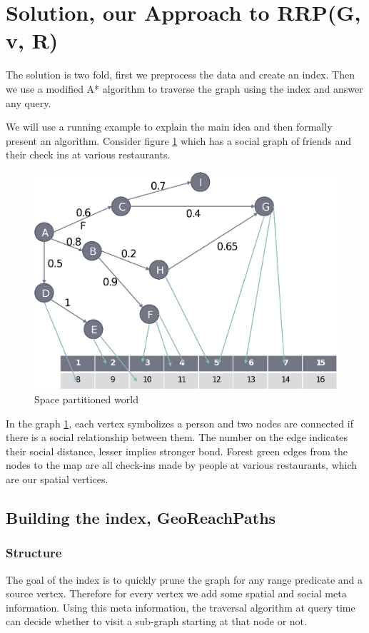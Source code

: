 \section{Solution, our Approach to RRP(G, v, R)}

{The solution is two fold, first we preprocess the data and create an index. Then we use a modified A* algorithm to traverse the graph using the index and answer any query.}

{We will use a running example to explain the main idea and then formally present an algorithm. Consider figure \ref{fig:space-partitioned} which has a social graph of friends and their check ins at various restaurants.}

\begin{figure}[h]
	\includegraphics[width=0.9\linewidth]{images/image05.eps}
    \caption{Space partitioned world}
    \label{fig:space-partitioned}
\end{figure}

{In the graph \ref{fig:space-partitioned}, each vertex symbolizes a person and two nodes are connected if there is a social relationship between them. The number on the edge indicates their social distance, lesser implies stronger bond. Forest green edges from the nodes to the map are all check-ins made by people at various restaurants, which are our spatial vertices. }

\subsection{Building the index, GeoReachPaths}

\subsubsection{Structure}
The goal of the index is to quickly prune the graph for any range predicate and a source vertex. Therefore for every vertex we add some spatial and social meta information. Using this meta information, the traversal algorithm at query time can decide whether to visit a sub-graph starting at that node or not.

